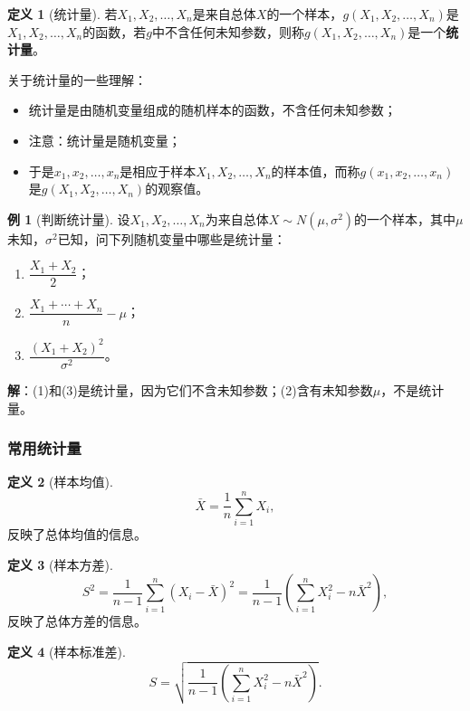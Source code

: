\documentclass[11pt,a4paper]{report}
\theoremstyle{definition}
\newtheorem{definition}{定义}[chapter]
\newtheorem{example}{例}[chapter]
\begin{document}
\begin{definition}[统计量]
若$X_{1},X_{2},\ldots,X_{n}$是来自总体$X$的一个样本，$g(X_{1},X_{2},\ldots,X_{n})$是$X_{1},X_{2},\ldots,X_{n}$的函数，若$g$中不含任何未知参数，则称$g(X_{1},X_{2},\ldots,X_{n})$是一个\textbf{统计量}。
\end{definition}

关于统计量的一些理解：
\begin{itemize}[leftmargin=2em]
    \item 统计量是由随机变量组成的随机样本的函数，不含任何未知参数；
    \item 注意：统计量是随机变量；
    \item 于是$x_{1},x_{2},\ldots,x_{n}$是相应于样本$X_{1},X_{2},\ldots,X_{n}$的样本值，而称$g(x_{1},x_{2},\ldots,x_{n})$是$g(X_{1},X_{2},\ldots,X_{n})$的观察值。
\end{itemize}

\begin{example}[判断统计量]
设$X_{1},X_{2},\ldots,X_{n}$为来自总体$X\sim N(\mu,\sigma^{2})$的一个样本，其中$\mu$未知，$\sigma^{2}$已知，问下列随机变量中哪些是统计量：
\begin{enumerate}[label=(\arabic*),leftmargin=2em]
    \item $\dfrac{X_{1}+X_{2}}{2}$；
    \item $\dfrac{X_{1}+\cdots+X_{n}}{n}-\mu$；
    \item $\dfrac{(X_{1}+X_{2})^{2}}{\sigma^{2}}$。
\end{enumerate}

\textbf{解}：(1)和(3)是统计量，因为它们不含未知参数；(2)含有未知参数$\mu$，不是统计量。
\end{example}

\subsubsection*{常用统计量}

\begin{definition}[样本均值]
\[
\bar{X}=\frac{1}{n}\sum_{i=1}^{n}X_{i},
\]
反映了总体均值的信息。
\end{definition}

\begin{definition}[样本方差]
\[
S^{2}=\frac{1}{n-1}\sum_{i=1}^{n}(X_{i}-\bar{X})^{2}=\frac{1}{n-1}\left(\sum_{i=1}^{n}X_{i}^{2}-n\bar{X}^{2}\right),
\]
反映了总体方差的信息。
\end{definition}

\begin{definition}[样本标准差]
\[
S=\sqrt{\frac{1}{n-1}\left(\sum_{i=1}^{n}X_{i}^{2}-n\bar{X}^{2}\right)}.
\]
\end{definition}
\end{document}
